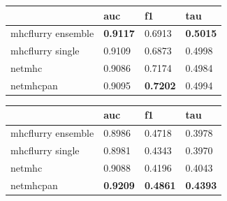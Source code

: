 \begin{tabular}{llll}
\toprule
{} &              auc &               f1 &              tau \\
\midrule
mhcflurry ensemble &  \textbf{0.9117} &           0.6913 &  \textbf{0.5015} \\
mhcflurry single   &           0.9109 &           0.6873 &           0.4998 \\
netmhc             &           0.9086 &           0.7174 &           0.4984 \\
netmhcpan          &           0.9095 &  \textbf{0.7202} &           0.4994 \\
\bottomrule
\end{tabular}

\begin{tabular}{llll}
\toprule
{} &              auc &               f1 &              tau \\
\midrule
mhcflurry ensemble &           0.8986 &           0.4718 &           0.3978 \\
mhcflurry single   &           0.8981 &           0.4343 &           0.3970 \\
netmhc             &           0.9088 &           0.4196 &           0.4043 \\
netmhcpan          &  \textbf{0.9209} &  \textbf{0.4861} &  \textbf{0.4393} \\
\bottomrule
\end{tabular}







